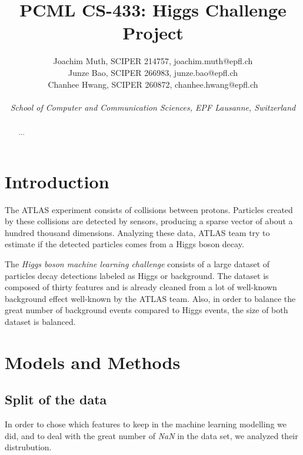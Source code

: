 \documentclass[10pt,conference,compsocconf]{IEEEtran}
\begin{document}
\title{PCML CS-433: Higgs Challenge Project}

\author{
  Joachim Muth, SCIPER 214757, joachim.muth@epfl.ch\\
  Junze Bao, SCIPER 266983, junze.bao@epfl.ch\\
  Chanhee Hwang, SCIPER 260872, chanhee.hwang@epfl.ch\\ \\
  \textit{School of Computer and Communication Sciences, EPF Lausanne, Switzerland}
}

\maketitle

\begin{abstract}
...
\end{abstract}

\section{Introduction}
The ATLAS experiment consists of collisions between protons. Particles created by these collisions are detected by sensors, producing a sparse vector of about a hundred thousand dimensions. Analyzing these data, ATLAS team try to estimate if the detected particles comes from a Higgs boson decay.

The \emph{Higgs boson machine learning challenge} consists of a large dataset of particles decay detections labeled as Higgs or background. The dataset is composed of thirty features and is already cleaned from a lot of well-known background effect well-known by the ATLAS team. Also, in order to balance the great number of background events compared to Higgs events, the size of both dataset is balanced.~\cite{higgsChallenge}

\section{Models and Methods}

\subsection{Split of the data}
In order to chose which features to keep in the machine learning modelling we did, and to deal with the great number of \emph{NaN} in the data set, we analyzed their distrubution. 
\end{document}
